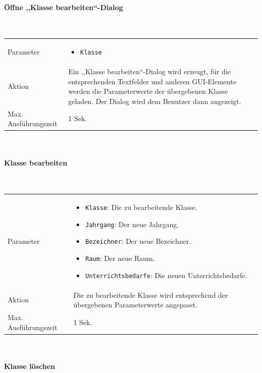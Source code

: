 \documentclass[fontsize=12pt,paper=a4,twoside]{scrartcl}
\begin{document}
\paragraph{Öffne ,,Klasse bearbeiten``-Dialog}\mbox{}\\

\begin{tabularx}{\textwidth}{p{4cm}X}
Parameter & \begin{itemize}[itemsep=0pt, leftmargin = 0.5cm]
			\item \texttt{Klasse}
			\end{itemize}\\
Aktion & Ein ,,Klasse bearbeiten``-Dialog wird erzeugt, für die entsprechenden Textfelder und anderen GUI-Elemente werden die Parameterwerte der übergebenen Klasse geladen. Der Dialog wird dem Benutzer dann angezeigt.\\
Max. Ausführungszeit & 1 Sek. 
\end{tabularx}\\


\paragraph{Klasse bearbeiten}\mbox{}\\

\begin{tabularx}{\textwidth}{p{4cm}X}
Parameter & \begin{itemize}[itemsep=0pt, leftmargin = 0.5cm]
			\item \texttt{Klasse}: Die zu bearbeitende Klasse.
			\item \texttt{Jahrgang}: Der neue Jahrgang.
			\item \texttt{Bezeichner}: Der neue Bezeichner.
			\item \texttt{Raum}: Der neue Raum.
			\item \texttt{Unterrichtsbedarfe}: Die neuen Unterrichtsbedarfe.
			\end{itemize}\\
Aktion & Die zu bearbeitende Klasse wird entsprechend der übergebenen Parameterwerte angepasst. \\
Max. Ausführungszeit & 1 Sek. 
\end{tabularx}\\


\paragraph{Klasse löschen}\mbox{}\\
\end{document}
